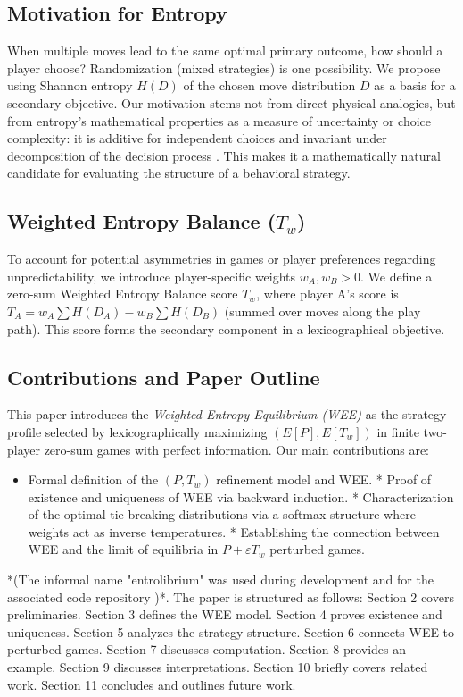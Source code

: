 \documentclass{article}
\begin{document}
\subsection{Motivation for Entropy}
When multiple moves lead to the same optimal primary outcome, how should a player choose? Randomization (mixed strategies) is one possibility. We propose using Shannon entropy $H(D)$ of the chosen move distribution $D$ as a basis for a secondary objective. Our motivation stems not from direct physical analogies, but from entropy's mathematical properties as a measure of uncertainty or choice complexity: it is additive for independent choices and invariant under decomposition of the decision process \cite{placeholder_shannon_properties}. This makes it a mathematically natural candidate for evaluating the structure of a behavioral strategy.

\subsection{Weighted Entropy Balance (\texorpdfstring{$T_w$}{Tw})}
To account for potential asymmetries in games or player preferences regarding unpredictability, we introduce player-specific weights $w_A, w_B > 0$. We define a zero-sum Weighted Entropy Balance score $T_w$, where player A's score is $T_A = w_A \sum H(D_A) - w_B \sum H(D_B)$ (summed over moves along the play path). This score forms the secondary component in a lexicographical objective.

\subsection{Contributions and Paper Outline}
This paper introduces the \emph{Weighted Entropy Equilibrium (WEE)} as the strategy profile selected by lexicographically maximizing $(E[P], E[T_w])$ in finite two-player zero-sum games with perfect information. Our main contributions are:
\begin{itemize}
    \item Formal definition of the $(P, T_w)$ refinement model and WEE.
    * Proof of existence and uniqueness of WEE via backward induction.
    * Characterization of the optimal tie-breaking distributions via a softmax structure where weights act as inverse temperatures.
    * Establishing the connection between WEE and the limit of equilibria in $P + \varepsilon T_w$ perturbed games.
\end{itemize}
*(The informal name "entrolibrium" was used during development and for the associated code repository \cite{placeholder_repo})*.
The paper is structured as follows: Section 2 covers preliminaries. Section 3 defines the WEE model. Section 4 proves existence and uniqueness. Section 5 analyzes the strategy structure. Section 6 connects WEE to perturbed games. Section 7 discusses computation. Section 8 provides an example. Section 9 discusses interpretations. Section 10 briefly covers related work. Section 11 concludes and outlines future work.
\end{document}
